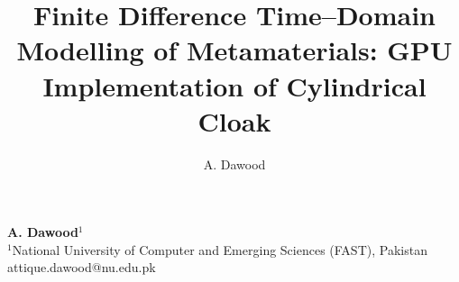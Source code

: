 \documentclass{book}    %
\begin{document}
\title{Finite Difference Time--Domain Modelling of Metamaterials: GPU Implementation of Cylindrical Cloak}
\maketitle

\author      {A. Dawood}
\address     {}%
\postalcode  {}%
\fax         {}    %
\misc        { }  %
\nomakeauthor

\begin{authors}

{\bf A. Dawood}$^{1}$\\
\medskip
$^{1}$National University of Computer and Emerging Sciences (FAST), Pakistan\\
attique.dawood@nu.edu.pk
\end{authors}
\end{document}
